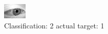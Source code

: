 \begin{figure}[h!]
\begin{center}
\includegraphics[width=0.60\columnwidth]{figures/ID2746_class_2_target_1.png}
\end{center}
\caption{ Classification: 2 actual target: 1}
\label{fig:ID2746_class_2_target_1}
\end{figure}
